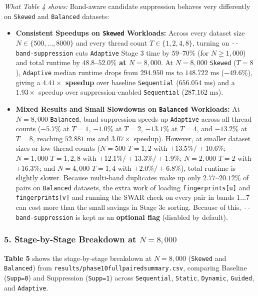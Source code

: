 \documentclass[11pt,a4paper]{article}
\renewcommand{\_}{\textunderscore\allowbreak}
\begin{document}
\textit{What Table 4 shows:} Band-aware candidate suppression behaves very differently on \texttt{Skewed} and \texttt{Balanced} datasets:
\begin{itemize}
    \item \textbf{Consistent Speedups on \texttt{Skewed} Workloads:} Across every dataset size $N \in \{500, \dots, 8000\}$ and every thread count $T \in \{1, 2, 4, 8\}$, turning on \texttt{-{}-band-suppression} cuts \texttt{Adaptive} Stage 3 time by $59\text{--}70\%$ (for $N \ge 1,000$) and total runtime by \textbf{$48.8\text{--}52.0\%$ at $N = 8,000$}. At $N=8,000$ \texttt{Skewed} ($T=8$), \texttt{Adaptive} median runtime drops from $294.950\text{ ms}$ to \textbf{$148.722\text{ ms}$} ($-49.6\%$), giving a \textbf{$4.41\times$ speedup} over baseline \texttt{Sequential} ($656.054\text{ ms}$) and a $1.93\times$ speedup over suppression-enabled \texttt{Sequential} ($287.162\text{ ms}$).
    \item \textbf{Mixed Results and Small Slowdowns on \texttt{Balanced} Workloads:} At $N = 8,000$ \texttt{Balanced}, band suppression speeds up \texttt{Adaptive} across all thread counts ($-5.7\%$ at $T=1$, $-1.0\%$ at $T=2$, $-13.1\%$ at $T=4$, and $-13.2\%$ at $T=8$, reaching $52.881\text{ ms}$ and $3.07\times$ speedup). However, at smaller dataset sizes or low thread counts ($N=500$ $T=1,2$ with $+13.5\%/+10.6\%$; $N=1,000$ $T=1,2,8$ with $+12.1\%/+13.3\%/+1.9\%$; $N=2,000$ $T=2$ with $+16.3\%$; and $N=4,000$ $T=1,4$ with $+2.0\%/+6.8\%$), total runtime is slightly slower. Because multi-band duplicates make up only $2.77\text{--}20.12\%$ of pairs on \texttt{Balanced} datasets, the extra work of loading \texttt{fingerprints[u]} and \texttt{fingerprints[v]} and running the SWAR check on every pair in bands $1 \dots 7$ can cost more than the small savings in Stage 3e sorting. Because of this, \texttt{-{}-band-suppression} is kept as an \textbf{optional flag} (disabled by default).
\end{itemize}

\subsubsection*{5. Stage-by-Stage Breakdown at $N = 8,000$}
\textbf{Table 5} shows the stage-by-stage breakdown at $N = 8,000$ (\texttt{Skewed} and \texttt{Balanced}) from \texttt{results/phase10\_full\_paired\_summary.csv}, comparing Baseline (\texttt{Supp=0}) and Suppression (\texttt{Supp=1}) across \texttt{Sequential}, \texttt{Static}, \texttt{Dynamic}, \texttt{Guided}, and \texttt{Adaptive}.
\end{document}
